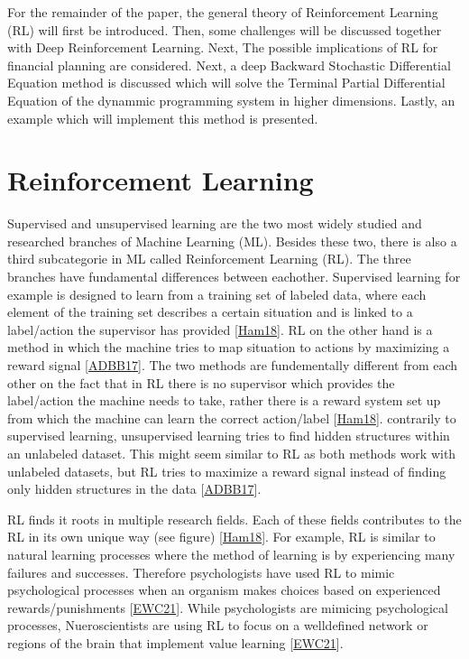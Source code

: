 \documentclass[letterpaper,10pt,english]{jupyterBook}
\begin{document}
\sphinxAtStartPar
For the remainder of the paper, the general theory of Reinforcement Learning (RL) will first be introduced. Then, some challenges will be discussed together with Deep Reinforcement Learning. Next, The possible implications of RL for financial planning are considered.  Next, a deep Backward Stochastic Differential Equation method is discussed which will solve the Terminal Partial Differential Equation of the dynammic programming system in higher dimensions. Lastly, an example which will implement this method is presented.


\section{Reinforcement Learning}
\label{\detokenize{Reinforcement_learning:reinforcement-learning}}\label{\detokenize{Reinforcement_learning::doc}}
\sphinxAtStartPar
Supervised and unsupervised learning are the two most widely studied and researched branches of Machine Learning (ML). Besides these two, there is also a third subcategorie in ML called Reinforcement Learning (RL). The three branches have fundamental differences between eachother. Supervised learning for example is designed to learn from a training set of labeled data, where each element of the training set describes a certain situation and is linked to a label/action the supervisor has provided {[}\hyperlink{cite.Financial_application:id62}{Ham18}{]}. RL on the other hand is a method in which the machine tries to map situation to actions by maximizing a reward signal {[}\hyperlink{cite.Financial_application:id63}{ADBB17}{]}. The two methods are fundementally different from each other on the fact that in RL there is no supervisor which provides the label/action the machine needs to take, rather there is a reward system set up from which the machine can learn the correct action/label {[}\hyperlink{cite.Financial_application:id62}{Ham18}{]}. contrarily to supervised learning, unsupervised learning tries to find hidden structures within an unlabeled dataset. This might seem similar to RL as both methods work with unlabeled datasets, but RL tries to maximize a reward signal instead of finding only hidden structures in the data {[}\hyperlink{cite.Financial_application:id63}{ADBB17}{]}.

\sphinxAtStartPar
RL finds it roots in multiple research fields. Each of these fields contributes to the RL in its own unique way (see figure) {[}\hyperlink{cite.Financial_application:id62}{Ham18}{]}. For example,  RL is similar to natural learning processes where the method of learning is by experiencing many failures and successes. Therefore psychologists have used RL to mimic psychological processes when an organism makes choices based on experienced rewards/punishments {[}\hyperlink{cite.Financial_application:id69}{EWC21}{]}. While psychologists are mimicing psychological processes, Nueroscientists are using RL to focus on a well\sphinxhyphen{}defined network or regions of the brain that implement value learning {[}\hyperlink{cite.Financial_application:id69}{EWC21}{]}.
\end{document}
